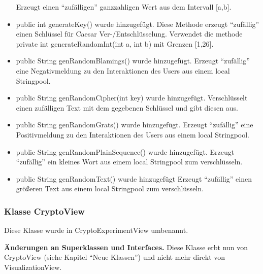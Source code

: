 \documentclass{article}
\begin{document}
\begin{itemize}
                   Erzeugt einen ``zufälligen'' ganzzahligen Wert aus dem Intervall [a,b].
             \item public int generateKey() wurde hinzugefügt.\newline
                   Diese Methode erzeugt ``zufällig'' einen Schlüssel für Caesar Ver-/Entschlüsselung.
                   Verwendet die methode private int generateRandomInt(int a, int b) mit Grenzen [1,26].
             \item public String genRandomBlamings() wurde hinzugefügt.\newline
                   Erzeugt ``zufällig'' eine Negativmeldung zu den Interaktionen des Users
                   aus einem local Stringpool.  
             \item public String genRandomCipher(int key) wurde hinzugefügt.\newline
                   Verschlüsselt einen zufälligen Text mit dem gegebenen Schlüssel 
                   und gibt diesen aus.
             \item public String genRandomGrats() wurde hinzugefügt.\newline
                   Erzeugt ``zufällig'' eine Positivmeldung zu den Interaktionen des Users
                   aus einem local Stringpool. 
             \item public String genRandomPlainSequence() wurde hinzugefügt.\newline
                   Erzeugt ``zufällig'' ein kleines Wort aus einem local Stringpool zum verschlüsseln. 
             \item public String genRandomText() wurde hinzugefügt\newline
                   Erzeugt ``zufällig'' einen größeren Text aus einem local Stringpool zum verschlüsseln.      
            \end{itemize}

	\subsubsection{Klasse CryptoView}
	 Diese Klasse wurde in CryptoExperimentView umbenannt.\newline
	 
	 \textbf{Änderungen an Superklassen und Interfaces.}\newline
	     Diese Klasse erbt nun von CryptoView (siehe Kapitel ``Neue Klassen'') und nicht mehr direkt von VisualizationView.\newline
	   
\end{document}
